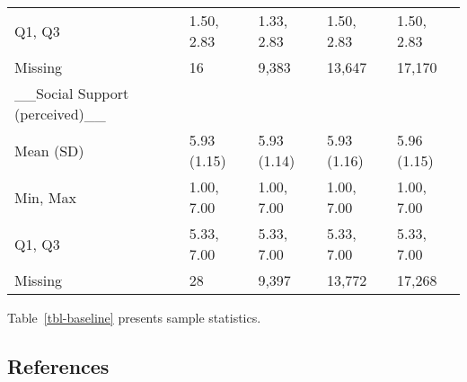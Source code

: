 \documentclass[
  single column]{article}
\begin{document}
\begin{longtable}[t]{lllll}
Q1, Q3 & 1.50, 2.83 & 1.33, 2.83 & 1.50, 2.83 & 1.50, 2.83\\
Missing & 16 & 9,383 & 13,647 & 17,170\\
\_\_Social Support (perceived)\_\_ &   ~~&   ~~&   ~~&   ~~\\
\addlinespace
Mean (SD) & 5.93 (1.15) & 5.93 (1.14) & 5.93 (1.16) & 5.96 (1.15)\\
Min, Max & 1.00, 7.00 & 1.00, 7.00 & 1.00, 7.00 & 1.00, 7.00\\
Q1, Q3 & 5.33, 7.00 & 5.33, 7.00 & 5.33, 7.00 & 5.33, 7.00\\
Missing & 28 & 9,397 & 13,772 & 17,268\\
\bottomrule

\end{longtable}

Table~\ref{tbl-baseline} presents sample statistics.

\subsection*{References}\label{references}
\end{document}
